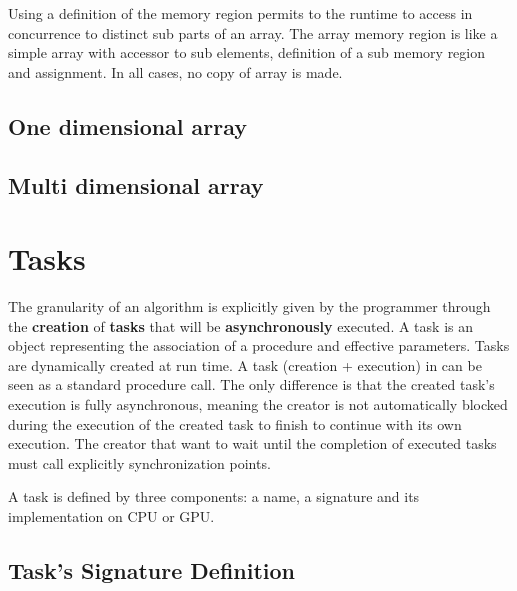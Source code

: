 Using a definition of the memory region permits to the runtime to access in concurrence to distinct sub parts of an array. The array memory region is like a simple array with accessor to sub elements, definition of a sub memory region and assignment. In all cases, no copy of array is made.

\subsection{One dimensional array}

\subsection{Multi dimensional array}


\newpage
\section{Tasks}\label{sec:task}

The granularity of an algorithm is explicitly given by the programmer through the \textbf{creation} of \textbf{tasks} that will be \textbf{asynchronously} executed. 
A task is an object representing the association of a procedure and effective parameters. Tasks are dynamically created at run time. A task (creation + execution) in \kaapi  can be 
seen as a standard procedure call. 
The only difference is that the created task's execution is fully asynchronous, meaning 
the creator is not automatically blocked during the execution of the created task to finish to continue with its own execution. The creator that want to wait until the completion of executed tasks must call explicitly synchronization points.

A task is defined by three components: a name, a signature and its implementation on CPU or GPU.

\subsection{Task's Signature Definition}

